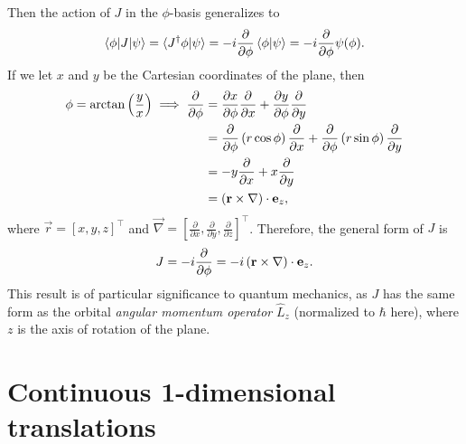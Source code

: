 Then the action of $J$ in the $\phi$-basis generalizes to
\begin{align*}
    \braket{\phi|J|\psi} = \braket{J^\dagger \phi|\psi} = -i\frac{\partial}{\partial\phi}\braket{\phi|\psi} = -i\frac{\partial}{\partial\phi}\psi(\phi).
\end{align*}
If we let $x$ and $y$ be the Cartesian coordinates of the plane, then
\begin{align*}
    \phi = \arctan\left(\frac{y}{x}\right) \implies \frac{\partial}{\partial\phi} 
        &= \frac{\partial x}{\partial \phi}\frac{\partial}{\partial x} + \frac{\partial y}{\partial \phi}\frac{\partial}{\partial y} \\
        &= \frac{\partial}{\partial\phi}\left( r\cos\phi \right)\frac{\partial}{\partial x} + \frac{\partial}{\partial\phi}\left( r\sin\phi \right)\frac{\partial}{\partial y} \\
        &= -y\frac{\partial}{\partial x} + x\frac{\partial}{\partial y} \\
        &= (\mathbf{r}\times\mathbf{\nabla})\cdot\mathbf{e}_z,
\end{align*}
where $\vec{r} = {[x,y,z]}^\top$ and $\vec{\nabla} = {\left[\frac{\partial}{\partial x},\frac{\partial}{\partial y},\frac{\partial}{\partial z}\right]}^\top$. Therefore, the general form of $J$ is
\begin{align}\label{eq:SO2_J}
    J = -i \frac{\partial}{\partial\phi} = -i \left( \mathbf{r}\times\mathbf{\nabla} \right)\cdot\mathbf{e}_z.
\end{align}
This result is of particular significance to quantum mechanics, as $J$ has the same form as the orbital \textit{angular momentum operator} $\hat{L}_z$ (normalized to $\hbar$ here), where $z$ is the axis of rotation of the plane\cite{Hall2013,Griffiths2018}.


\section{Continuous 1-dimensional translations}

